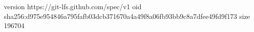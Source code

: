version https://git-lfs.github.com/spec/v1
oid sha256:d975e954846a795fafb03dcb371670a4a49f8a06fb93bb9c8a7dfee49fd9f173
size 196704
